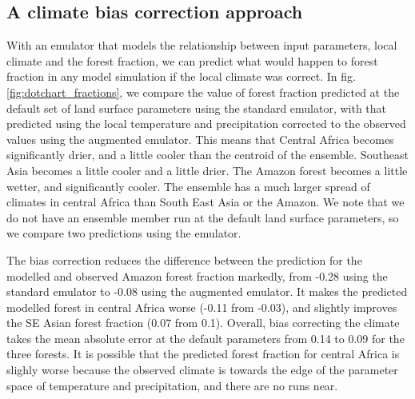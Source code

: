 \documentclass[gmd, manuscript]{copernicus}
\begin{document}
\subsection{A climate bias correction approach}\label{ssec:bc_approach}
With an emulator that models the relationship between input parameters, local climate and the forest fraction, we can predict what would happen to forest fraction in any model simulation if the local climate was correct. In fig. \ref{fig:dotchart_fractions}, we compare the value of forest fraction predicted at the default set of land surface parameters using the standard emulator, with that predicted using the local temperature and precipitation corrected to the observed values using the augmented emulator. This means that Central Africa becomes significantly drier, and a little cooler than the centroid of the ensemble. Southeast Asia becomes a little cooler and a little drier. The Amazon forest becomes a little wetter, and significantly cooler. The ensemble has a much larger spread of climates in central Africa than South East Asia or the Amazon. We note that we do not have an ensemble member run at the default land surface parameters, so we compare two predictions using the emulator.

The bias correction reduces the difference between the prediction for the modelled and observed Amazon forest fraction markedly, from -0.28 using the standard emulator to -0.08 using the augmented emulator. It makes the predicted modelled forest in central Africa worse (-0.11 from -0.03), and slightly improves the SE Asian forest fraction (0.07 from 0.1). Overall, bias correcting the climate takes the mean absolute error at the default parameters from 0.14 to 0.09 for the three forests. It is possible that the predicted forest fraction for central Africa is slighly worse because the observed climate is towards the edge of the parameter space of temperature and precipitation, and there are no runs near. 
\end{document}
